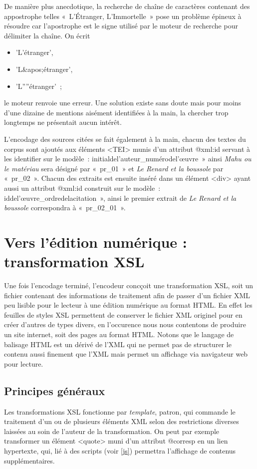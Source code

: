 \documentclass[12pt, a4paper]{article}
\begin{document}
De manière plus anecdotique, la recherche de chaîne de caractères contenant des appostrophe telles «~L'Étranger, L'Immortelle~» pose un problème épineux à résoudre car l'apostrophe est le signe utilisé par le moteur de recherche pour délimiter la chaîne. On écrit 
\begin{itemize}
    \item 'L'étranger', 
    \item 'L\&apos;étranger',
    \item 'L''''étranger'~; 
\end{itemize}
le moteur renvoie une erreur. Une solution existe sans doute mais pour moins d'une dizaine de mentions aisément identifiées à la main, la chercher trop longtemps ne présentait aucun intérêt.


L'encodage des sources citées se fait également à la main, chacun des textes du corpus sont ajoutés aux éléments <TEI> munis d'un attribut @xml:id servant à les identifier sur le modèle : initialdel'auteur_numérodel'œuvre » ainsi \textit{Mahu ou le matériau} sera désigné par « pr_01 » et \textit{Le Renard et la boussole} par « pr_02 ». Chacun des extraits est ensuite inséré dans un élément <div> ayant aussi un attribut @xml:id construit sur le modèle : iddel'œuvre_ordredelacitation », ainsi le premier extrait de \textit{Le Renard et la boussole} correspondra à « pr_02_01 ».    

\section{Vers l'édition numérique : transformation XSL}
\label{ref:xsl_gen}
Une fois l'encodage terminé, l'encodeur concçoit une transformation XSL, soit un fichier contenant des informations de traitement afin de passer d'un fichier XML peu lisible pour le lecteur à une édition numérique au format HTML. En effet les feuilles de styles XSL permettent de conserver le fichier XML originel pour en créer d'autres de types divers, en l'occurence nous nous contentons de produire un site internet, soit des pages au format HTML. Notons que le langage de balisage HTML est un dérivé de l'XML qui ne permet pas de structurer le contenu aussi finement que l'XML mais permet un affichage via navigateur web pour lecture.
    \subsection{Principes généraux}
Les transformations XSL fonctionne par \textit{template}, patron, qui commande le traitement d'un ou de plusieurs éléments XML selon des restrictions diverses laissées au soin de l'auteur de la transformation. On peut par exemple transformer un élément <quote> muni d'un attribut @corresp en un lien hypertexte, qui, lié à des scripts (voir \ref{js}) permettra l'affichage de contenus supplémentaires. 
\end{document}
